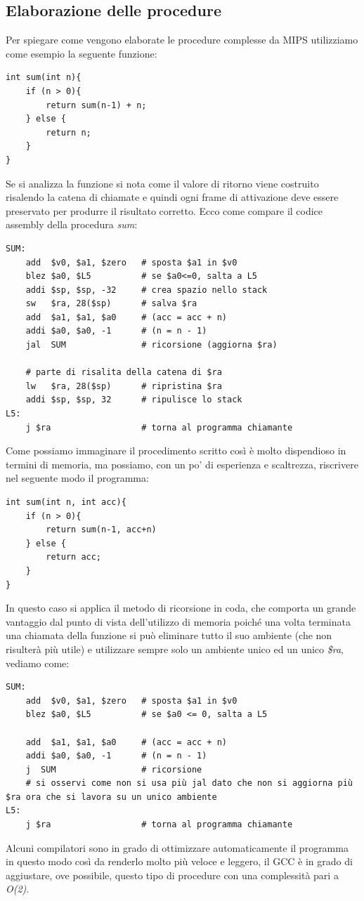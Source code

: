 \documentclass[class=book, crop=false]{standalone}
\begin{document}
\subsection{Elaborazione delle procedure}
Per spiegare come vengono elaborate le procedure complesse da MIPS utilizziamo come esempio la seguente funzione:

\begin{verbatim}
int sum(int n){
	if (n > 0){
		return sum(n-1) + n;
	} else {
		return n;
	}
}
\end{verbatim}

Se si analizza la funzione si nota come il valore di ritorno viene costruito risalendo la catena di chiamate e quindi ogni frame di attivazione deve essere preservato per produrre il risultato corretto. Ecco come compare il codice assembly della procedura \emph{sum}:

\begin{verbatim}
SUM:
	add  $v0, $a1, $zero   # sposta $a1 in $v0
	blez $a0, $L5          # se $a0<=0, salta a L5
	addi $sp, $sp, -32     # crea spazio nello stack
	sw   $ra, 28($sp)      # salva $ra
	add  $a1, $a1, $a0     # (acc = acc + n)
	addi $a0, $a0, -1      # (n = n - 1)
	jal  SUM               # ricorsione (aggiorna $ra)

	# parte di risalita della catena di $ra
	lw   $ra, 28($sp)      # ripristina $ra
	addi $sp, $sp, 32      # ripulisce lo stack
L5:
	j $ra                  # torna al programma chiamante
\end{verbatim}

Come possiamo immaginare il procedimento scritto così è  molto dispendioso in termini di memoria, ma possiamo, con un po' di esperienza e scaltrezza, riscrivere nel seguente modo il programma:

\begin{verbatim}
int sum(int n, int acc){
	if (n > 0){
		return sum(n-1, acc+n)
	} else {
		return acc;
	}
}
\end{verbatim}

In questo caso si applica il metodo di ricorsione in coda, che comporta un grande vantaggio dal punto di vista dell'utilizzo di memoria poiché una volta terminata una chiamata della funzione si può eliminare tutto il suo ambiente (che non risulterà più utile) e utilizzare sempre solo un ambiente unico ed un unico \emph{\$ra}, vediamo come:

\begin{verbatim}
SUM:
	add  $v0, $a1, $zero   # sposta $a1 in $v0
	blez $a0, $L5          # se $a0 <= 0, salta a L5

	add  $a1, $a1, $a0     # (acc = acc + n)
	addi $a0, $a0, -1      # (n = n - 1)
	j  SUM                 # ricorsione
	# si osservi come non si usa più jal dato che non si aggiorna più $ra ora che si lavora su un unico ambiente
L5:
	j $ra                  # torna al programma chiamante
\end{verbatim}
Alcuni compilatori sono in grado di ottimizzare automaticamente il programma in questo modo così da renderlo molto più veloce e leggero, il GCC è in grado di aggiustare, ove possibile, questo tipo di procedure con una complessità pari a \emph{O(2)}.
\end{document}
